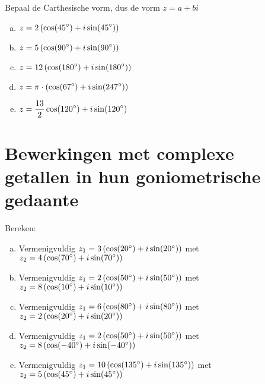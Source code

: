\documentclass[12pt,twoside]{article}
\begin{document}
\begin{oefening}
Bepaal de Carthesische vorm, dus de vorm $z=a+bi$
\begin{enumerate}[(a)]
  \itemsep.5em
  \item $\displaystyle z=2\left(\cos(45^\circ)+i\sin(45^\circ)\right)$
  \item $\displaystyle z=5\left(\cos(90^\circ)+i\sin(90^\circ)\right)$
  \item $\displaystyle z=12\left(\cos(180^\circ)+i\sin(180^\circ)\right)$
  \item $\displaystyle z=\pi\cdot\left(\cos(67^\circ)+i\sin(247^\circ)\right)$
  \item $\displaystyle z=\dfrac{13}{2}\cos(120^\circ)+i\sin(120^\circ)$
\end{enumerate}
\end{oefening}

\pagebreak
\section{Bewerkingen met complexe getallen in hun goniometrische gedaante}

\begin{oefening}
Bereken:
\begin{enumerate}[(a)]
  \itemsep.5em
  \item Vermenigvuldig $z_1=3\left(\cos(20^\circ)+i\sin(20^\circ)\right)$ met $z_2=4\left(\cos(70^\circ)+i\sin(70^\circ)\right)$
  \item Vermenigvuldig $z_1=2\left(\cos(50^\circ)+i\sin(50^\circ)\right)$ met $z_2=8\left(\cos(10^\circ)+i\sin(10^\circ)\right)$
  \item Vermenigvuldig $z_1=6\left(\cos(80^\circ)+i\sin(80^\circ)\right)$ met $z_2=2\left(\cos(20^\circ)+i\sin(20^\circ)\right)$
  \item Vermenigvuldig $z_1=2\left(\cos(50^\circ)+i\sin(50^\circ)\right)$ met $z_2=8\left(\cos(-40^\circ)+i\sin(-40^\circ)\right)$
  \item Vermenigvuldig $z_1=10\left(\cos(135^\circ)+i\sin(135^\circ)\right)$ met $z_2=5\left(\cos(45^\circ)+i\sin(45^\circ)\right)$
\end{enumerate}
\end{oefening}
\end{document}
